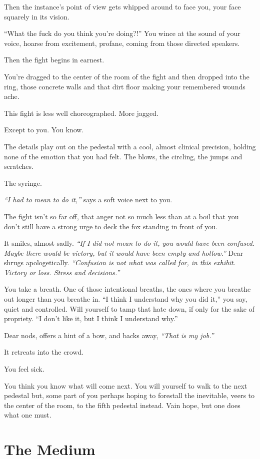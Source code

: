 Then the instance's point of view gets whipped around to face you, your face squarely in its vision.

``What the fuck do you think you're doing?!'' You wince at the sound of your voice, hoarse from excitement, profane, coming from those directed speakers.

Then the fight begins in earnest.

You're dragged to the center of the room of the fight and then dropped into the ring, those concrete walls and that dirt floor making your remembered wounds ache.

This fight is less well choreographed. More jagged.

Except to you. You know.

The details play out on the pedestal with a cool, almost clinical precision, holding none of the emotion that you had felt. The blows, the circling, the jumps and scratches.

The syringe.

\emph{``I had to mean to do it,''} says a soft voice next to you.

The fight isn't so far off, that anger not so much less than at a boil that you don't still have a strong urge to deck the fox standing in front of you.

It smiles, almost sadly. \emph{``If I did not mean to do it, you would have been confused. Maybe there would be victory, but it would have been empty and hollow.''} Dear shrugs apologetically. \emph{``Confusion is not what was called for, in this exhibit. Victory or loss. Stress and decisions.''}

You take a breath. One of those intentional breaths, the ones where you breathe out longer than you breathe in. ``I think I understand why you did it,'' you say, quiet and controlled. Will yourself to tamp that hate down, if only for the sake of propriety. ``I don't like it, but I think I understand why.''

Dear nods, offers a hint of a bow, and backs away, \emph{``That is my job.''}

It retreats into the crowd.

You feel sick.

You think you know what will come next. You will yourself to walk to the next pedestal but, some part of you perhaps hoping to forestall the inevitable, veers to the center of the room, to the fifth pedestal instead. Vain hope, but one does what one must.

\newpage
\section*{The Medium}

